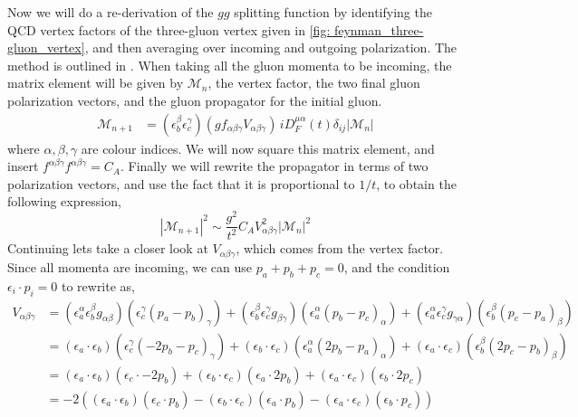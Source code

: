 \documentclass[main.tex]{subfiles}
\begin{document}
Now we will do a re-derivation of the \(gg\) splitting function by identifying the QCD vertex factors of the three-gluon vertex given in \autoref{fig: feynman_three-gluon_vertex}, and then averaging over incoming and outgoing polarization. The method is outlined in \cite{ellis_stirling_webber_1996}. When taking all the gluon momenta to be incoming, the matrix element will be given by \(\mathcal{M}_n\), the vertex factor, the two final gluon polarization vectors, and the gluon propagator for the initial gluon. 
\begin{align}
    \mathcal{M}_{n+1} &=  \left( \epsilon_b^\beta \epsilon_c^\gamma  \right) \left(gf_{\alpha\beta\gamma} V_{\alpha\beta\gamma}\right)  \, i D_F^{\mu\alpha}(t)\delta_{ij}  |\mathcal{M}_n|
\end{align}
where \(\alpha,\beta,\gamma\) are colour indices. We will now square this matrix element, and insert \(f^{\alpha\beta\gamma}f^{\alpha\beta\gamma}=C_A\). Finally we will rewrite the propagator in terms of two polarization vectors, and use the fact that it is proportional to \(1/t\), to obtain the following expression,
\begin{equation}\label{eqn: ggg_matrix_element}
    |\mathcal{M}_{n+1}|^2 \sim \frac{g^2}{t^2} C_A V_{\alpha\beta\gamma}^2  |\mathcal{M}_n|^2
\end{equation}
Continuing lets take a closer look at \(V_{\alpha\beta\gamma}\), which comes from the vertex factor. Since all momenta are incoming, we can use \(p_a +p_b +p_c = 0\), and the condition \(\epsilon_i \cdot p_i = 0\) to rewrite as,
\begin{align}\label{eqn: ggg_vertex_factor_Ellis_5.6}
    V_{\alpha\beta\gamma} &= 
    (\epsilon_a^\alpha \epsilon_b^\beta g_{\alpha\beta})(\epsilon_c^\gamma (p_a-p_b)_\gamma) + 
    (\epsilon_b^\beta \epsilon_c^\gamma g_{\beta\gamma})(\epsilon_a^\alpha (p_b-p_c)_\alpha) + 
    (\epsilon_a^\alpha \epsilon_c^\gamma g_{\gamma\alpha})(\epsilon_b^\beta (p_c-p_a)_\beta) \nonumber \\
    &=
    (\epsilon_a \cdot \epsilon_b)(\epsilon_c^\gamma (-2p_b- p_c)_\gamma) + 
    (\epsilon_b \cdot \epsilon_c)(\epsilon_a^\alpha (2p_b -p_a)_\alpha) + 
    (\epsilon_a \cdot \epsilon_c)(\epsilon_b^\beta (2p_c-p_b)_\beta) \nonumber \\
    &= 
    (\epsilon_a \cdot \epsilon_b)(\epsilon_c \cdot -2p_b) + 
    (\epsilon_b \cdot \epsilon_c)(\epsilon_a \cdot 2p_b) +
    (\epsilon_a \cdot \epsilon_c)(\epsilon_b \cdot 2p_c) \nonumber\\
    &= -2\left(
    (\epsilon_a \cdot \epsilon_b)(\epsilon_c \cdot p_b) - 
    (\epsilon_b \cdot \epsilon_c)(\epsilon_a \cdot p_b) -
    (\epsilon_a \cdot \epsilon_c)(\epsilon_b \cdot p_c) 
    \right)
\end{align}
\end{document}
